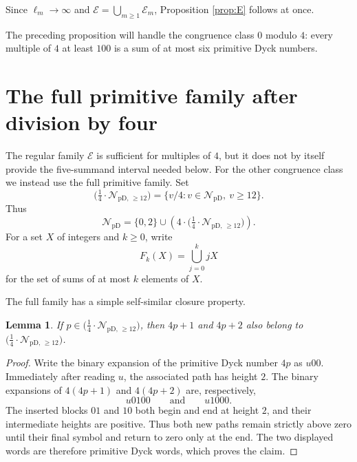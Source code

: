 \documentclass[12pt]{article}
\theoremstyle{plain}
\newtheorem{lemma}[theorem]{Lemma}
\newcommand{\NpD}{\mathcal{N}_{\mathrm{pD}}}
\newcommand{\Pset}{\bigl(\tfrac14\cdot
  \mathcal{N}_{\mathrm{pD},\,\geq12}\bigr)}
\begin{document}
Since $\ell_{m}\to\infty$ and $\mathcal E=\bigcup_{m\geq1}\mathcal E_{m}$,
Proposition \ref{prop:E} follows at once.

The preceding proposition will handle the congruence class $0$ modulo
$4$: every multiple of $4$ at least $100$ is a sum of at most six
primitive Dyck numbers.

\section{The full primitive family after division by four}

The regular family $\mathcal E$ is sufficient for multiples of $4$, but
it does not by itself provide the five-summand interval needed below.
For the other congruence class we instead use the full primitive family.
Set
\[
 \Pset=\{v/4:v\in\NpD,\ v\geq12\}.
\]
Thus
\[
 \NpD=\{0,2\}\cup(4\cdot\Pset).
\]
For a set $X$ of integers and $k\geq0$, write
\[
 F_k(X)=\bigcup_{j=0}^{k}jX
\]
for the set of sums of at most $k$ elements of $X$.

The full family has a simple self-similar closure property.

\begin{lemma}\label{lem:Pclosure}
If $p\in\Pset$, then $4p+1$ and $4p+2$ also belong to $\Pset$.
\end{lemma}

\begin{proof}
Write the binary expansion of the primitive Dyck number $4p$ as $u00$.
Immediately after reading $u$, the associated path has height $2$.  The
binary expansions of $4(4p+1)$ and $4(4p+2)$ are, respectively,
\[
 u0100\qquad\text{and}\qquad u1000.
\]
The inserted blocks $01$ and $10$ both begin and end at height $2$, and
their intermediate heights are positive.  Thus both new paths remain
strictly above zero until their final symbol and return to zero only at
the end.  The two displayed words are therefore primitive Dyck words,
which proves the claim.
\end{proof}
\end{document}

